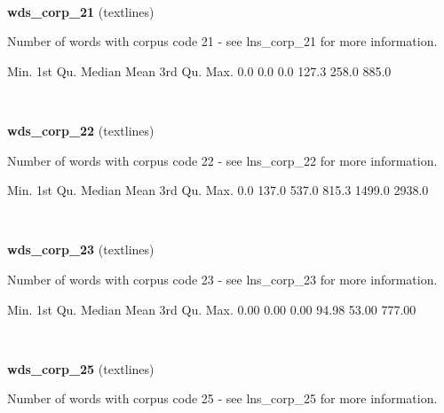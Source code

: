 \documentclass[]{article}
\newenvironment{Shaded}{\begin{snugshade}}{\end{snugshade}}
\newcommand{\FloatTok}[1]{\textcolor[rgb]{0.00,0.00,0.81}{{#1}}}
\newcommand{\NormalTok}[1]{{#1}}
\begin{document}
~

\vspace{1em}

\textbf{wds\_corp\_21} (textlines)

Number of words with corpus code 21 - see lns\_corp\_21 for more
information.

\begin{Shaded}
\begin{Highlighting}[]
   \NormalTok{Min. 1st Qu.  Median    Mean 3rd Qu.    Max. }
    \FloatTok{0.0}     \FloatTok{0.0}     \FloatTok{0.0}   \FloatTok{127.3}   \FloatTok{258.0}   \FloatTok{885.0} 
\end{Highlighting}
\end{Shaded}

~

\vspace{1em}

\textbf{wds\_corp\_22} (textlines)

Number of words with corpus code 22 - see lns\_corp\_22 for more
information.

\begin{Shaded}
\begin{Highlighting}[]
   \NormalTok{Min. 1st Qu.  Median    Mean 3rd Qu.    Max. }
    \FloatTok{0.0}   \FloatTok{137.0}   \FloatTok{537.0}   \FloatTok{815.3}  \FloatTok{1499.0}  \FloatTok{2938.0} 
\end{Highlighting}
\end{Shaded}

~

\vspace{1em}

\textbf{wds\_corp\_23} (textlines)

Number of words with corpus code 23 - see lns\_corp\_23 for more
information.

\begin{Shaded}
\begin{Highlighting}[]
   \NormalTok{Min. 1st Qu.  Median    Mean 3rd Qu.    Max. }
   \FloatTok{0.00}    \FloatTok{0.00}    \FloatTok{0.00}   \FloatTok{94.98}   \FloatTok{53.00}  \FloatTok{777.00} 
\end{Highlighting}
\end{Shaded}

~

\vspace{1em}

\textbf{wds\_corp\_25} (textlines)

Number of words with corpus code 25 - see lns\_corp\_25 for more
information.
\end{document}
